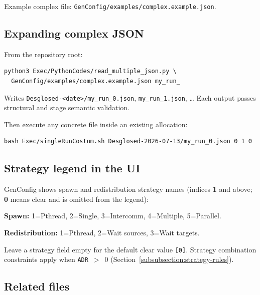 Example complex file: \texttt{GenConfig/examples/complex.example.json}.

\subsection{Expanding complex JSON}

From the repository root:

\begin{lstlisting}[style=bashstyle,caption={CLI expansion.},captionpos=b]
python3 Exec/PythonCodes/read_multiple_json.py \
  GenConfig/examples/complex.example.json my_run_
\end{lstlisting}

Writes \texttt{Desglosed-<date>/my\_run\_0.json}, \texttt{my\_run\_1.json}, \ldots{} Each output passes structural and stage semantic validation.

Then execute any concrete file inside an existing allocation:

\begin{lstlisting}[style=bashstyle]
bash Exec/singleRunCostum.sh Desglosed-2026-07-13/my_run_0.json 0 1 0
\end{lstlisting}

\subsection{Strategy legend in the UI}

GenConfig shows spawn and redistribution strategy names (indices \textbf{1} and above; \textbf{0} means clear and is omitted from the legend):

\textbf{Spawn:} 1=Pthread, 2=Single, 3=Intercomm, 4=Multiple, 5=Parallel.

\textbf{Redistribution:} 1=Pthread, 2=Wait sources, 3=Wait targets.

Leave a strategy field empty for the default clear value \texttt{[0]}. Strategy combination constraints apply when \texttt{ADR}~$>$~0 (Section~\ref{subsubsection:strategy-rules}).

\subsection{Related files}

